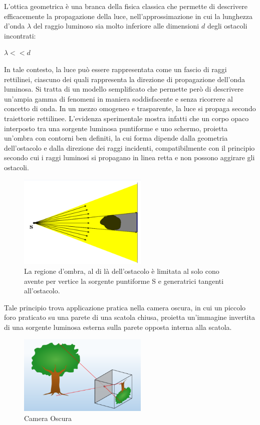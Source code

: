 L'ottica geometrica è una branca della fisica classica che permette di descrivere 
efficacemente la propagazione della luce, nell'approssimazione in cui la lunghezza d'onda $\lambda$ del raggio luminoso 
sia molto inferiore alle dimensioni $d$ degli ostacoli incontrati: 
\begin{center}
	$\lambda << d$
\end{center}
In tale contesto, la luce può essere rappresentata come un fascio di raggi rettilinei, 
ciascuno dei quali rappresenta la direzione di propagazione dell'onda luminosa. Si tratta di un modello semplificato che 
permette però di descrivere un'ampia gamma di fenomeni in maniera soddisfacente e senza ricorrere al concetto di onda. In un mezzo omogeneo e trasparente, la luce si propaga secondo traiettorie rettilinee. 
L'evidenza sperimentale mostra infatti che  un corpo opaco interposto tra una sorgente luminosa puntiforme e uno schermo, 
proietta un'ombra con contorni ben definiti, la cui forma dipende dalla geometria dell'ostacolo e dalla direzione dei raggi incidenti, 
compatibilmente con il principio secondo cui i raggi luminosi si propagano in linea retta e non possono aggirare gli ostacoli.
\begin{figure}[H]
	\centering
	\includegraphics[width=0.55\textwidth]{./figures/cono-luce}
	\caption{La regione d’ombra, al di là
		dell’ostacolo è limitata al solo
		cono avente per vertice la sorgente
		puntiforme S e generatrici tangenti
		all’ostacolo.}
\end{figure}

Tale principio trova applicazione pratica nella camera oscura, in cui un piccolo foro praticato su una parete di una scatola chiusa, proietta un'immagine invertita di una sorgente 
luminosa esterna sulla parete opposta interna alla scatola.
\begin{figure}[H]
	\centering
	\includegraphics[width=0.55\textwidth]{./figures/camera_oscura}
	\caption{Camera Oscura}
\end{figure}

